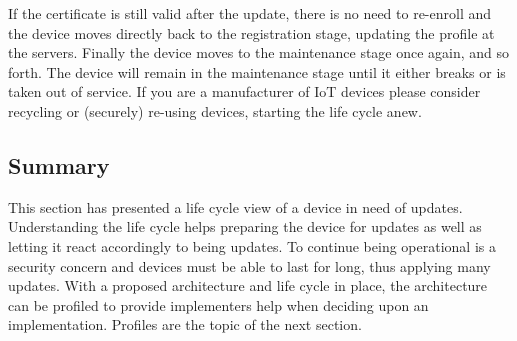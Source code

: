 \documentclass[0-thesis.tex]{subfiles}
\begin{document}
If the certificate is still valid after the update, there is no need to re-enroll and the
device moves directly back to the registration stage, updating the profile at the servers.
Finally the device moves to the maintenance stage once again, and so forth. The device
will remain in the maintenance stage until it either breaks or is taken out of service. If
you are a manufacturer of IoT devices please consider recycling or (securely) re-using
devices, starting the life cycle anew.

\subsection{Summary}
\label{sec:life-cycle-summary}
This section has presented a life cycle view of a device in need of updates. Understanding
the life cycle helps preparing the device for updates as well as letting it react
accordingly to being updates. To continue being operational is a security concern and
devices must be able to last for long, thus applying many updates. With a proposed
architecture and life cycle in place, the architecture can be profiled to provide
implementers help when deciding upon an implementation. Profiles are the topic of the next
section.
\end{document}
